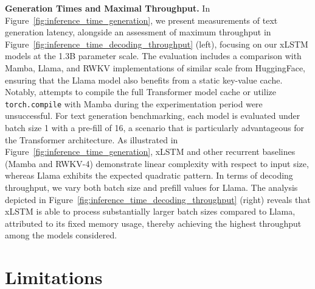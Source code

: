\textbf{Generation Times and Maximal Throughput.} In Figure~\ref{fig:inference_time_generation}, we present measurements of text generation latency, alongside an assessment of maximum throughput in Figure~\ref{fig:inference_time_decoding_throughput} (left), focusing on our xLSTM models at the 1.3B parameter scale. The evaluation includes a comparison with Mamba, Llama, and RWKV implementations of similar scale from HuggingFace, ensuring that the Llama model also benefits from a static key-value cache. Notably, attempts to compile the full Transformer model cache or utilize \texttt{torch.compile} with Mamba during the experimentation period were unsuccessful. For text generation benchmarking, each model is evaluated under batch size 1 with a pre-fill of 16, a scenario that is particularly advantageous for the Transformer architecture. As illustrated in Figure~\ref{fig:inference_time_generation}, xLSTM and other recurrent baselines (Mamba and RWKV-4) demonstrate linear complexity with respect to input size, whereas Llama exhibits the expected quadratic pattern. In terms of decoding throughput, we vary both batch size and prefill values for Llama. The analysis depicted in Figure~\ref{fig:inference_time_decoding_throughput} (right) reveals that xLSTM is able to process substantially larger batch sizes compared to Llama, attributed to its fixed memory usage, thereby achieving the highest throughput among the models considered.

\section{Limitations}

